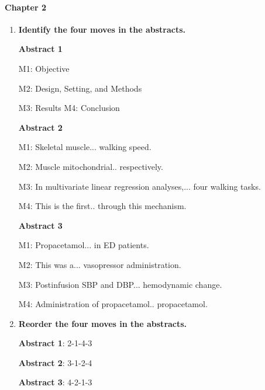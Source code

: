 \documentclass[a4paper]{ctexbook}
\begin{document}
\paragraph*{Chapter 2}\par
\begin{enumerate}
  \item \textbf{Identify the four moves in the abstracts.}
  
  \textbf{Abstract 1}

  \hspace*{2em}M1: Objective 

  \hspace*{2em}M2: Design, Setting, and Methods 

  \hspace*{2em}M3: Results M4: Conclusion 
  
  \textbf{Abstract 2}

  \hspace*{2em}M1: Skeletal muscle... walking speed.

  \hspace*{2em}M2: Muscle mitochondrial.. respectively.

  \hspace*{2em}M3: In multivariate linear regression analyses,... four walking tasks.
  
  \hspace*{2em}M4: This is the first.. through this mechanism.
  
  \textbf{Abstract 3}
  
  \hspace*{2em}M1: Propacetamol... in ED patients.
  
  \hspace*{2em}M2: This was a... vasopressor administration.
  
  \hspace*{2em}M3: Postinfusion SBP and DBP... hemodynamic change.
  
  \hspace*{2em}M4: Administration of propacetamol.. propacetamol.
  
  \item \textbf{Reorder the four moves in the abstracts.}

  \textbf{Abstract 1}: 2-1-4-3
  
  \textbf{Abstract 2}: 3-1-2-4

  \textbf{Abstract 3}: 4-2-1-3

\end{enumerate}
\end{document}

